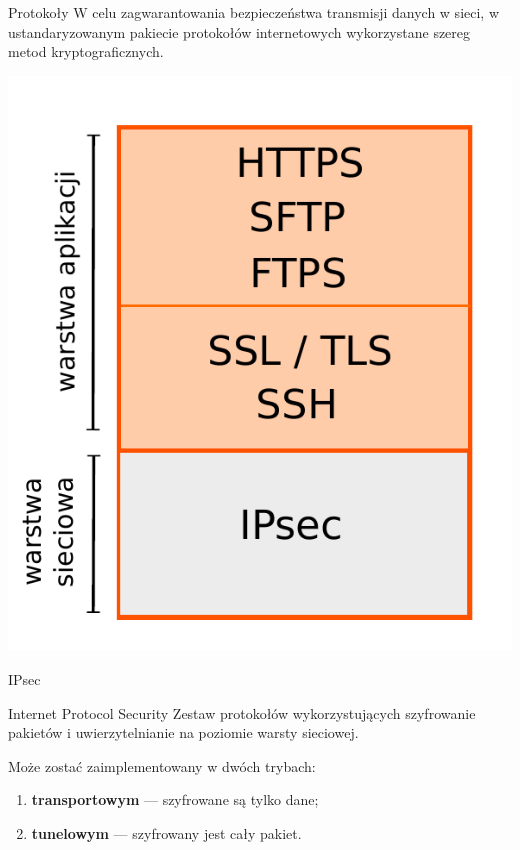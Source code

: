 \begin{frame}{Protokoły}
	W celu zagwarantowania bezpieczeństwa transmisji danych w sieci, w ustandaryzowanym pakiecie protokołów internetowych wykorzystane szereg metod kryptograficznych.
	\begin{center}
		\includegraphics[height=0.4\paperwidth]{images/protocols.pdf}	
	\end{center}

\end{frame}

\begin{frame}{IPsec}
	\begin{alertblock}{Internet Protocol Security}
		Zestaw protokołów wykorzystujących szyfrowanie pakietów i uwierzytelnianie na poziomie warsty sieciowej. 
	\end{alertblock}
		\vspace{\fill}
		Może zostać zaimplementowany w dwóch trybach:
		
		\begin{enumerate}
			\item \textbf{transportowym} — szyfrowane są tylko dane;
			\item \textbf{tunelowym} — szyfrowany jest cały pakiet.
		\end{enumerate}
\end{frame}

